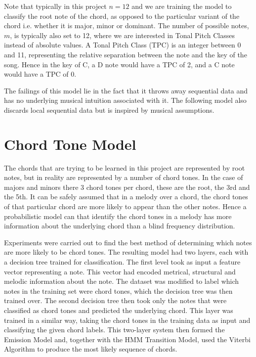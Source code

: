 \documentclass[bsc,logo,twoside,singlespacing,parskip,deptreport]{infthesis}
\begin{document}
Note that typically in this project $n = 12$ and we are training the model to classify the root note of the chord, as opposed to the particular variant of the chord i.e. whether it is major, minor or dominant. The number of possible notes, $m$, is typically also set to 12, where we are interested in Tonal Pitch Classes instead of absolute values. A Tonal Pitch Class (TPC) is an integer between 0 and 11, representing the relative separation between the note and the key of the song. Hence in the key of C, a D note would have a TPC of 2, and a C note would have a TPC of 0.

The failings of this model lie in the fact that it throws away sequential data and has no underlying musical intuition associated with it. The following model also discards local sequential data but is inspired by musical assumptions.

\section{Chord Tone Model}

The chords that are trying to be learned in this project are represented by root notes, but in reality are represented by a number of chord tones. In the case of majors and minors there 3 chord tones per chord, these are the root, the 3rd and the 5th. It can be safely assumed that in a melody over a chord, the chord tones of that particular chord are more likely to appear than the other notes. Hence a probabilistic model can that identify the chord tones in a melody has more information about the underlying chord than a blind frequency distribution.

Experiments were carried out to find the best method of determining which notes are more likely to be chord tones. The resulting model had two layers, each with a decision tree trained for classification. The first level took as input a feature vector representing a note. This vector had encoded metrical, structural and melodic information about the note. The dataset was modified to label which notes in the training set were chord tones, which the decision tree was then trained over. The second decision tree then took only the notes that were classified as chord tones and predicted the underlying chord. This layer was trained in a similar way, taking the chord tones in the training data as input and classifying the given chord labels. This two-layer system then formed the Emission Model and, together with the HMM Transition Model, used the Viterbi Algorithm to produce the most likely sequence of chords.
\end{document}
